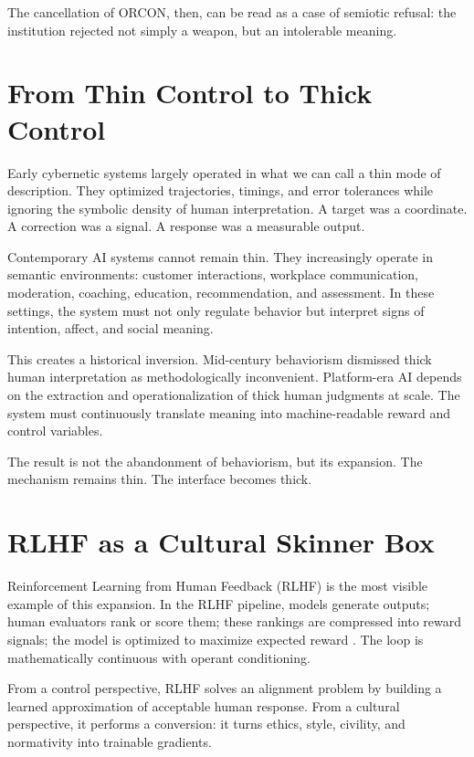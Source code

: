 \documentclass[runningheads]{llncs}
\begin{document}
The cancellation of ORCON, then, can be read as a case of semiotic refusal: the institution rejected not simply a weapon, but an intolerable meaning.

\section{From Thin Control to Thick Control}

Early cybernetic systems largely operated in what we can call a thin mode of description. They optimized trajectories, timings, and error tolerances while ignoring the symbolic density of human interpretation. A target was a coordinate. A correction was a signal. A response was a measurable output.

Contemporary AI systems cannot remain thin. They increasingly operate in semantic environments: customer interactions, workplace communication, moderation, coaching, education, recommendation, and assessment. In these settings, the system must not only regulate behavior but interpret signs of intention, affect, and social meaning.

This creates a historical inversion. Mid-century behaviorism dismissed thick human interpretation as methodologically inconvenient. Platform-era AI depends on the extraction and operationalization of thick human judgments at scale. The system must continuously translate meaning into machine-readable reward and control variables.

The result is not the abandonment of behaviorism, but its expansion. The mechanism remains thin. The interface becomes thick.

\section{RLHF as a Cultural Skinner Box}

Reinforcement Learning from Human Feedback (RLHF) is the most visible example of this expansion. In the RLHF pipeline, models generate outputs; human evaluators rank or score them; these rankings are compressed into reward signals; the model is optimized to maximize expected reward \cite{sutton2018reinforcement}. The loop is mathematically continuous with operant conditioning.

From a control perspective, RLHF solves an alignment problem by building a learned approximation of acceptable human response. From a cultural perspective, it performs a conversion: it turns ethics, style, civility, and normativity into trainable gradients.
\end{document}
